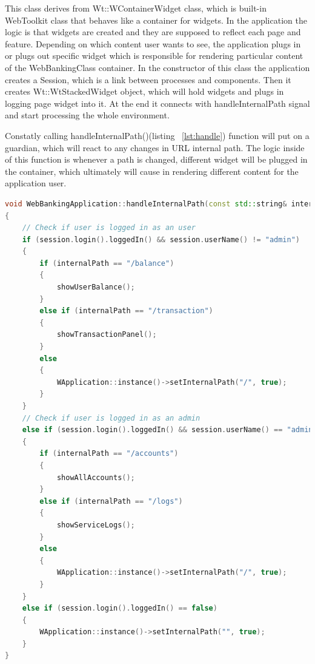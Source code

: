 \documentclass[a4paper,12pt]{book}
\begin{document}
{\bigskip
This class derives  from Wt::WContainerWidget class, which is built-in WebToolkit class that behaves like a container for widgets. In the application the logic is that widgets are created and they are supposed to reflect each page and feature. Depending on which content user wants to see, the application plugs in or plugs out specific widget which is responsible for rendering particular content of the WebBankingClass container. In the constructor of this class the application creates a Session, which is a link between processes and components. Then it creates Wt::WtStackedWidget object, which will hold widgets and plugs in logging page widget into it. At the end it connects with handleInternalPath signal and start processing the whole environment. 

\bigskip
Constatly calling handleInternalPath()(listing ~\ref{lst:handle}) function will put on a guardian, which will react to any changes in URL internal path. The logic inside of this function is whenever a path is changed, different widget will be plugged in the container, which ultimately will cause in rendering different content for the application user.

\bigskip
\begin{lstlisting}[frame=single, label={lst:handle}, basicstyle=\small, language=C++, caption={handleInternalPath() function. It reacts to URL changes. Regarding the internal path, different content is being rendered. For instance if path is changed to localhost:8080/balance then this function checks if user is logged in. If so, showUserBalance() function is being called, which clears all current widgets and plugs in user balance widget, which will cause in displaying the balance of the currently logged in user. If the user is not logged, the path will be immediately changed to localhost:8080 and the logging page will be rendered.}, captionpos=b]
void WebBankingApplication::handleInternalPath(const std::string& internalPath)
{
	// Check if user is logged in as an user
	if (session.login().loggedIn() && session.userName() != "admin") 
	{
		if (internalPath == "/balance") 
		{								
			showUserBalance();
		}
		else if (internalPath == "/transaction")
		{
			showTransactionPanel();
		}
		else
		{
			WApplication::instance()->setInternalPath("/", true);
		}
	}
	// Check if user is logged in as an admin
	else if (session.login().loggedIn() && session.userName() == "admin")
	{
		if (internalPath == "/accounts")
		{
			showAllAccounts();
		}
		else if (internalPath == "/logs")
		{
			showServiceLogs();
		}
		else
		{
			WApplication::instance()->setInternalPath("/", true);
		}
	}
	else if (session.login().loggedIn() == false)
	{
		WApplication::instance()->setInternalPath("", true);
	}
}
\end{lstlisting}

}
\end{document}
